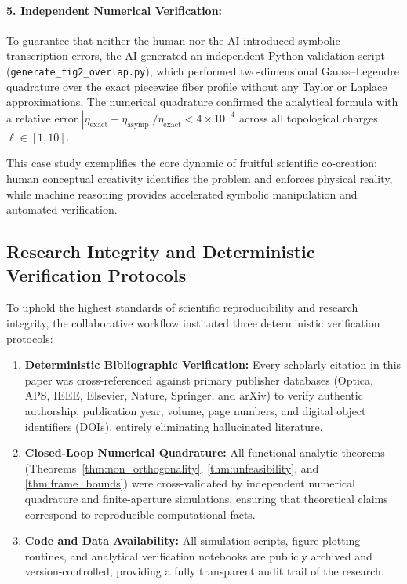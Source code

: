 \documentclass{optica-article}
\begin{document}
\paragraph{5. Independent Numerical Verification:}
To guarantee that neither the human nor the AI introduced symbolic transcription errors, the AI generated an independent Python validation script (\texttt{generate\_fig2\_overlap.py}), which performed two-dimensional Gauss--Legendre quadrature over the exact piecewise fiber profile without any Taylor or Laplace approximations. The numerical quadrature confirmed the analytical formula with a relative error $|\eta_{\text{exact}} - \eta_{\text{asymp}}| / \eta_{\text{exact}} < 4 \times 10^{-4}$ across all topological charges $\ell \in [1, 10]$.

This case study exemplifies the core dynamic of fruitful scientific co-creation: human conceptual creativity identifies the problem and enforces physical reality, while machine reasoning provides accelerated symbolic manipulation and automated verification.

\subsection{Research Integrity and Deterministic Verification Protocols}
\label{subsec:research_integrity}

To uphold the highest standards of scientific reproducibility and research integrity, the collaborative workflow instituted three deterministic verification protocols:
\begin{enumerate}
    \item \textbf{Deterministic Bibliographic Verification:} Every scholarly citation in this paper was cross-referenced against primary publisher databases (Optica, APS, IEEE, Elsevier, Nature, Springer, and arXiv) to verify authentic authorship, publication year, volume, page numbers, and digital object identifiers (DOIs), entirely eliminating hallucinated literature.
    \item \textbf{Closed-Loop Numerical Quadrature:} All functional-analytic theorems (Theorems~\ref{thm:non_orthogonality}, \ref{thm:unfeasibility}, and \ref{thm:frame_bounds}) were cross-validated by independent numerical quadrature and finite-aperture simulations, ensuring that theoretical claims correspond to reproducible computational facts.
    \item \textbf{Code and Data Availability:} All simulation scripts, figure-plotting routines, and analytical verification notebooks are publicly archived and version-controlled, providing a fully transparent audit trail of the research.
\end{enumerate}
\end{document}

